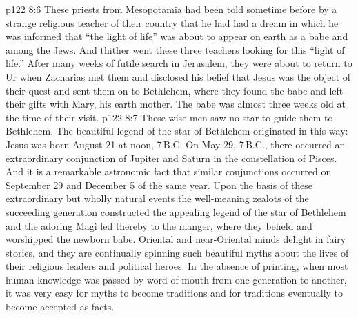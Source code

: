 \vs p122 8:6 These priests from Mesopotamia had been told sometime before by a strange religious teacher of their country that he had had a dream in which he was informed that “the light of life” was about to appear on earth as a babe and among the Jews. And thither went these three teachers looking for this “light of life.” After many weeks of futile search in Jerusalem, they were about to return to Ur when Zacharias met them and disclosed his belief that Jesus was the object of their quest and sent them on to Bethlehem, where they found the babe and left their gifts with Mary, his earth mother. The babe was almost three weeks old at the time of their visit.
\vs p122 8:7 These wise men saw no star to guide them to Bethlehem. The beautiful legend of the star of Bethlehem originated in this way: Jesus was born August 21 at noon, 7\,B.C. On May 29, 7\,B.C., there occurred an extraordinary conjunction of Jupiter and Saturn in the constellation of Pisces. And it is a remarkable astronomic fact that similar conjunctions occurred on September 29 and December 5 of the same year. Upon the basis of these extraordinary but wholly natural events the well\hyp{}meaning zealots of the succeeding generation constructed the appealing legend of the star of Bethlehem and the adoring Magi led thereby to the manger, where they beheld and worshipped the newborn babe. Oriental and near\hyp{}Oriental minds delight in fairy stories, and they are continually spinning such beautiful myths about the lives of their religious leaders and political heroes. In the absence of printing, when most human knowledge was passed by word of mouth from one generation to another, it was very easy for myths to become traditions and for traditions eventually to become accepted as facts.
